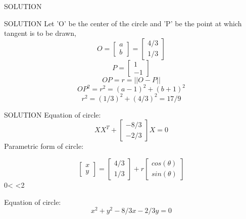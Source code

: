 \documentclass[10pt]{beamer}
\begin{document}
{\begin{frame}{SOLUTION}
\end{frame}
\begin{frame}{SOLUTION}
Let 'O' be the center of the circle and 'P' be the point at which tangent is to be drawn,
\begin{equation}
O=
\begin{bmatrix}
a\\
b
\end{bmatrix}
=
\begin{bmatrix}
4/3\\
1/3
\end{bmatrix}
\end{equation}   
\begin{equation}
P=
\begin{bmatrix}
1\\
-1
\end{bmatrix}
\end{equation}  
\begin{equation}
OP=r=
|| O - P ||
\end{equation}  
\begin{equation}
OP^2=r^2=(a-1)^2+(b+1)^2
\end{equation}  
\begin{equation}
r^2=(1/3)^2+(4/3)^2=17/9
\end{equation}  

\end{frame}
\begin{frame}{SOLUTION}
Equation of circle:
\begin{equation}
XX^T+
\begin{bmatrix}
-8/3\\
-2/3
\end{bmatrix}
X=0
\end{equation}
Parametric form of circle:

\begin{equation}
\begin{bmatrix}
x\\
y
\end{bmatrix}
=
\begin{bmatrix}
4/3\\
1/3
\end{bmatrix}
+r
\begin{bmatrix}
cos(\theta)\\
sin(\theta)
\end{bmatrix}
\end{equation}    
0< \theta <2\pi

Equation of circle:
\begin{equation}
x^2+y^2-8/3x-2/3y=0  
\end{equation}
\end{frame}

}
\end{document}
